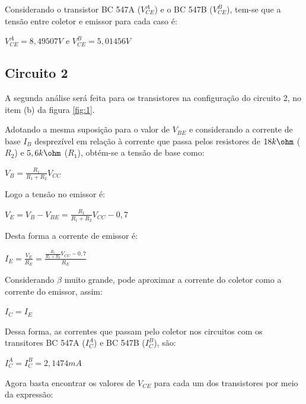 Considerando o transistor BC 547A ($V_{CE}^{A}$) e o BC 547B ($V_{CE}^{B}$), tem-se que a tensão entre coletor e emissor para cada caso é:

\begin{center}
    $V_{CE}^{A} = 8,49507 V$ e $V_{CE}^{B} = 5,01456 V$
\end{center}

\subsection{Circuito 2}

A segunda análise será feita para os transistores na configuração do circuito 2, no item (b) da figura \ref{fig:1}.

Adotando a mesma suposição para o valor de $V_{BE}$ e considerando a corrente de base $I_B$ desprezível em relação à corrente que passa pelos resistores de $18k\ohm$ ($R_2$) e $5,6k\ohm$ ($R_1$), obtém-se a tensão de base como:

\begin{center}
    $V_{B} = \frac{R_1}{R_1 + R_2}V_{CC}$
\end{center}

Logo a tensão no emissor é:

\begin{center}
    $V_{E} = V_{B} - V_{BE} = \frac{R_1}{R_1 + R_2}V_{CC} - 0,7$
\end{center}

Desta forma a corrente de emissor é:

\begin{center}
    $I_{E} = \frac{V_E}{R_E} = \frac{\frac{R_1}{R_1 + R_2}V_{CC} - 0,7}{R_E}$
\end{center}

Considerando $\beta$ muito grande, pode aproximar a corrente do coletor como a corrente do emissor, assim:

\begin{center}
    $I_{C} = I_{E}$
\end{center}

Dessa forma, as correntes que passam pelo coletor nos circuitos com os transitores BC 547A ($I_{C}^{A}$) e BC 547B ($I_{C}^{B}$), são:

\begin{center}
    $I_{C}^{A} = I_{C}^{B} = 2,1474 mA$ 
\end{center}

Agora basta encontrar os valores de $V_{CE}$ para cada um dos transistores por meio da expressão:


